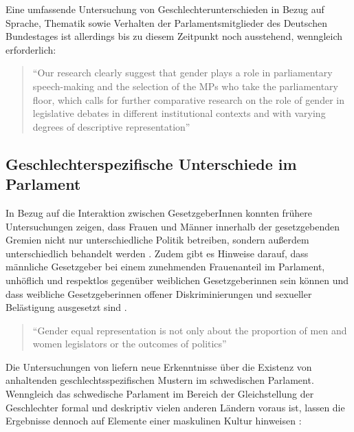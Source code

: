 \documentclass[12pt, 
    twoside=false, 
    bibliography=totoc, 
    numbers=endperiod, 
    headings=normal, 
    toc=chapterentrydotfill
    ]{scrbook}
\begin{document}
Eine umfassende Untersuchung von Geschlechterunterschieden in Bezug auf Sprache, Thematik sowie Verhalten der Parlamentsmitglieder des Deutschen Bundestages ist allerdings bis zu diesem Zeitpunkt noch ausstehend, wenngleich erforderlich: 

\citereset
\begin{quote}
 \enquote{Our research clearly suggest that gender plays a role in parliamentary speech-making and the selection of the MPs who take the parliamentary floor, which calls for further comparative research on the role of gender in legislative  debates in different institutional contexts and with varying degrees of descriptive representation}
  \parencite[515]{back_2014}
\end{quote}

\subsection{Geschlechterspezifische Unterschiede im Parlament}

In Bezug auf die Interaktion zwischen GesetzgeberInnen konnten frühere Untersuchungen zeigen, dass Frauen und Männer innerhalb der gesetzgebenden Gremien nicht nur unterschiedliche Politik betreiben, sondern außerdem unterschiedlich behandelt werden \parencites[201]{erikson_2018}{childs_2004}. Zudem gibt es Hinweise darauf, dass männliche Gesetzgeber bei einem zunehmenden Frauenanteil im Parlament, unhöflich und respektlos gegenüber weiblichen Gesetzgeberinnen sein können \parencites[201]{erikson_2018}{kathlene_1994}{kathlene_2004} und dass weibliche Gesetzgeberinnen offener Diskriminierungen und sexueller Belästigung ausgesetzt sind \parencites[201]{erikson_2018}[76]{lovenduski_2005}{lovenduski_2004}.

\begin{quote}
    \enquote{Gender equal representation is not only about the proportion of men and women legislators or the outcomes of politics}\parencite[197]{erikson_2018}
\end{quote}
 
Die Untersuchungen von \textcite{erikson_2018} liefern neue Erkenntnisse über die Existenz von anhaltenden geschlechtsspezifischen Mustern im schwedischen Parlament. Wenngleich das schwedische Parlament im Bereich der Gleichstellung der Geschlechter formal und deskriptiv vielen anderen Ländern voraus ist, lassen die Ergebnisse dennoch auf Elemente einer maskulinen Kultur hinweisen \parencite[211]{erikson_2018}:
\end{document}
